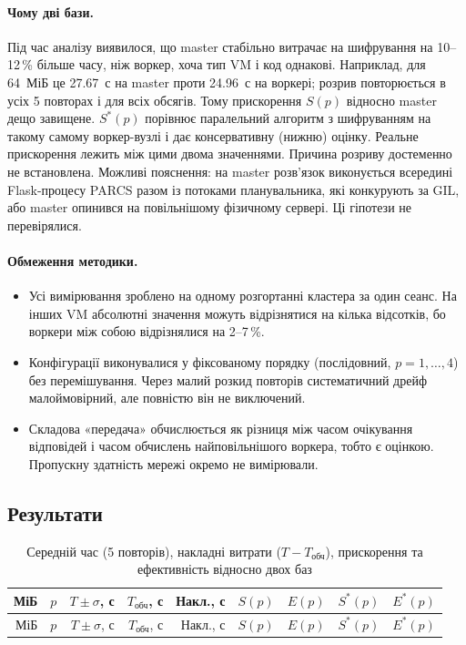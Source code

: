 \documentclass[a4paper,12pt]{article}
\begin{document}
\paragraph{Чому дві бази.} Під час аналізу виявилося, що master стабільно витрачає на шифрування
на 10--12\,\% більше часу, ніж воркер, хоча тип VM і код однакові. Наприклад, для 64~МіБ це 27.67~с на master
проти 24.96~с на воркері; розрив повторюється в усіх 5 повторах і для всіх обсягів.
Тому прискорення $S(p)$ відносно master дещо завищене. $S^*(p)$ порівнює паралельний алгоритм
з шифруванням на такому самому воркер-вузлі і дає консервативну (нижню) оцінку. Реальне
прискорення лежить між цими двома значеннями. Причина розриву достеменно не встановлена.
Можливі пояснення: на master розв'язок виконується всередині Flask-процесу PARCS разом із
потоками планувальника, які конкурують за GIL, або master опинився на повільнішому фізичному
сервері. Ці гіпотези не перевірялися.

\paragraph{Обмеження методики.}
\begin{itemize}
  \item Усі вимірювання зроблено на одному розгортанні кластера за один сеанс. На інших VM
        абсолютні значення можуть відрізнятися на кілька відсотків, бо воркери між собою
        відрізнялися на 2--7\,\%.
  \item Конфігурації виконувалися у фіксованому порядку (послідовний, $p=1, \dots, 4$) без
        перемішування. Через малий розкид повторів систематичний дрейф малоймовірний,
        але повністю він не виключений.
  \item Складова «передача» обчислюється як різниця між часом очікування відповідей і часом
        обчислень найповільнішого воркера, тобто є оцінкою. Пропускну здатність мережі окремо
        не вимірювали.
\end{itemize}

\subsection{Результати}
{\small
\setlength{\tabcolsep}{4.5pt}
\begin{longtable}{rrrrrrrrr}
  \caption{Середній час (5 повторів), накладні витрати ($T - T_{\text{обч}}$), прискорення та ефективність відносно двох баз}\label{tab:results}\\
  \toprule
  МіБ & $p$ & $T \pm \sigma$, с & $T_{\text{обч}}$, с & Накл., с & $S(p)$ & $E(p)$ & $S^*(p)$ & $E^*(p)$ \\
  \midrule
  \endfirsthead
  \toprule
  МіБ & $p$ & $T \pm \sigma$, с & $T_{\text{обч}}$, с & Накл., с & $S(p)$ & $E(p)$ & $S^*(p)$ & $E^*(p)$ \\
  \midrule
  \endhead
  
\end{longtable}
}
\end{document}
